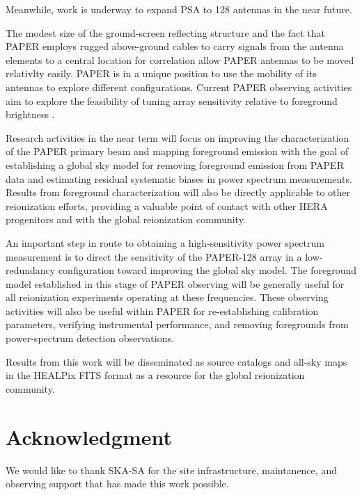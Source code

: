 \documentclass[preprint]{aastex}
\begin{document}
Meanwhile, work is underway to
expand PSA to 128 antennas in the near future.

The modest size of the ground-screen reflecting structure and the fact
that PAPER employs rugged above-ground cables to carry signals from the antenna
elements to a central location for correlation allow PAPER antennas to be
moved relativlty easily.
PAPER is in a unique position to use the mobility of its antennas to
explore different configurations.  Current PAPER observing activities aim to explore
the feasibility of tuning array sensitivity relative to foreground
brightness \citep{parsons_et_al2011}.  

Research
activities in the near term will focus on improving the
characterization of the PAPER primary beam and mapping foreground
emission with the goal of establishing a global sky model for removing
foreground emission from PAPER data and estimating residual systematic
biases in power spectrum measurements.  Results from foreground
characterization will also be directly applicable to other
reionization efforts, providing a valuable point of contact with other
HERA progenitors and with the global reionization community.

An important step in route to obtaining a high-sensitivity power spectrum
measurement is to direct the sensitivity of the PAPER-128 array in a
low-redundancy configuration toward improving the global sky model.
The foreground model established in this stage of PAPER observing will
be generally useful for all reionization experiments operating at
these frequencies.  These observing activities will also be useful
within PAPER for re-establishing calibration parameters, verifying
instrumental performance, and removing foregrounds from power-spectrum
detection observations.

Results from this work will be disseminated as
source catalogs and all-sky maps in the HEALPix FITS format \citep{gorski_et_al2006} as a
resource for the global reionization community.

\section{Acknowledgment}

We would like to thank SKA-SA for the site infrastructure, maintanence, and observing support
that has made this work possible.
\end{document}
